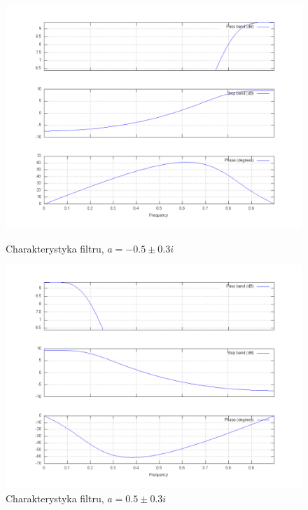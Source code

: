 \documentclass[wide,a4paper,titlepage,12pt]{mwart}
\begin{document}
  \begin{figure}[htbp]
    \begin{center}
      \includegraphics[scale=.3]{out/fig33.png}
      \caption{\label{fig33} Charakterystyka filtru, $a=-0.5\pm0.3i$}
      \includegraphics[scale=.3]{out/fig34.png}
      \caption{\label{fig34} Charakterystyka filtru, $a=0.5\pm0.3i$}

    \end{center}
  \end{figure}

\FloatBarrier
\end{document}
